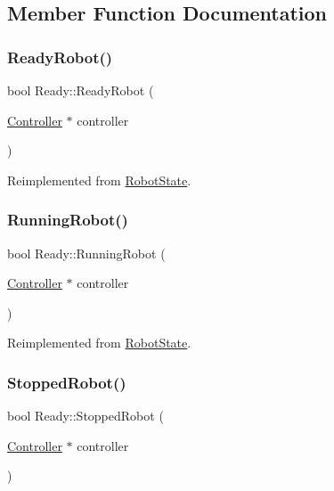 \subsection{Member Function Documentation}
\mbox{\label{class_ready_abc21fdcc13ef0bd14361cdd1b2cd73a6}} 
\subsubsection{\texorpdfstring{ReadyRobot()}{ReadyRobot()}}
{\footnotesize\ttfamily bool Ready\+::\+Ready\+Robot (\begin{DoxyParamCaption}\item[{\mbox{\hyperlink{class_controller}{Controller}} $\ast$}]{controller }\end{DoxyParamCaption})\hspace{0.3cm}{\ttfamily [virtual]}}



Reimplemented from \mbox{\hyperlink{class_robot_state_a1e8e2842a62f2666b3c687ec090a3b4f}{Robot\+State}}.

\mbox{\label{class_ready_a963ef4cb03dacb0b1f31eb4125b7fd68}} 
\subsubsection{\texorpdfstring{RunningRobot()}{RunningRobot()}}
{\footnotesize\ttfamily bool Ready\+::\+Running\+Robot (\begin{DoxyParamCaption}\item[{\mbox{\hyperlink{class_controller}{Controller}} $\ast$}]{controller }\end{DoxyParamCaption})\hspace{0.3cm}{\ttfamily [virtual]}}



Reimplemented from \mbox{\hyperlink{class_robot_state_a34151e935ca2807b89df8ab7f0561487}{Robot\+State}}.

\mbox{\label{class_ready_a88f3f1d4ef8b595ab9b9e421aa3a45c8}} 
\subsubsection{\texorpdfstring{StoppedRobot()}{StoppedRobot()}}
{\footnotesize\ttfamily bool Ready\+::\+Stopped\+Robot (\begin{DoxyParamCaption}\item[{\mbox{\hyperlink{class_controller}{Controller}} $\ast$}]{controller }\end{DoxyParamCaption})\hspace{0.3cm}{\ttfamily [virtual]}}



